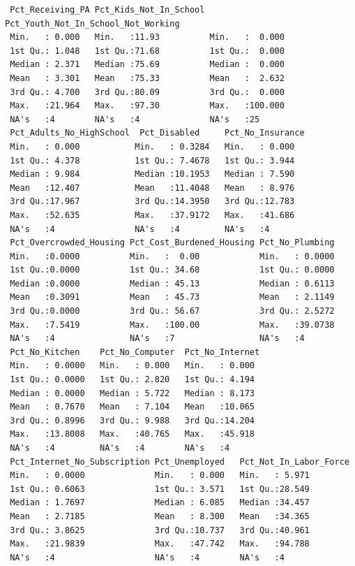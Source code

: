 \documentclass[
  letterpaper,
  DIV=11,
  numbers=noendperiod]{scrreprt}
\begin{document}
\begin{verbatim}
 Pct_Receiving_PA Pct_Kids_Not_In_School Pct_Youth_Not_In_School_Not_Working
 Min.   : 0.000   Min.   :11.93          Min.   :  0.000                    
 1st Qu.: 1.048   1st Qu.:71.68          1st Qu.:  0.000                    
 Median : 2.371   Median :75.69          Median :  0.000                    
 Mean   : 3.301   Mean   :75.33          Mean   :  2.632                    
 3rd Qu.: 4.700   3rd Qu.:80.09          3rd Qu.:  0.000                    
 Max.   :21.964   Max.   :97.30          Max.   :100.000                    
 NA's   :4        NA's   :4              NA's   :25                         
 Pct_Adults_No_HighSchool  Pct_Disabled     Pct_No_Insurance
 Min.   : 0.000           Min.   : 0.3284   Min.   : 0.000  
 1st Qu.: 4.378           1st Qu.: 7.4678   1st Qu.: 3.944  
 Median : 9.984           Median :10.1953   Median : 7.590  
 Mean   :12.407           Mean   :11.4048   Mean   : 8.976  
 3rd Qu.:17.967           3rd Qu.:14.3950   3rd Qu.:12.783  
 Max.   :52.635           Max.   :37.9172   Max.   :41.686  
 NA's   :4                NA's   :4         NA's   :4       
 Pct_Overcrowded_Housing Pct_Cost_Burdened_Housing Pct_No_Plumbing  
 Min.   :0.0000          Min.   :  0.00            Min.   : 0.0000  
 1st Qu.:0.0000          1st Qu.: 34.68            1st Qu.: 0.0000  
 Median :0.0000          Median : 45.13            Median : 0.6113  
 Mean   :0.3091          Mean   : 45.73            Mean   : 2.1149  
 3rd Qu.:0.0000          3rd Qu.: 56.67            3rd Qu.: 2.5272  
 Max.   :7.5419          Max.   :100.00            Max.   :39.0738  
 NA's   :4               NA's   :7                 NA's   :4        
 Pct_No_Kitchen    Pct_No_Computer  Pct_No_Internet 
 Min.   : 0.0000   Min.   : 0.000   Min.   : 0.000  
 1st Qu.: 0.0000   1st Qu.: 2.820   1st Qu.: 4.194  
 Median : 0.0000   Median : 5.722   Median : 8.173  
 Mean   : 0.7670   Mean   : 7.104   Mean   :10.065  
 3rd Qu.: 0.8996   3rd Qu.: 9.988   3rd Qu.:14.204  
 Max.   :13.8008   Max.   :40.765   Max.   :45.918  
 NA's   :4         NA's   :4        NA's   :4       
 Pct_Internet_No_Subscription Pct_Unemployed   Pct_Not_In_Labor_Force
 Min.   : 0.0000              Min.   : 0.000   Min.   : 5.971        
 1st Qu.: 0.6063              1st Qu.: 3.571   1st Qu.:28.549        
 Median : 1.7697              Median : 6.085   Median :34.457        
 Mean   : 2.7185              Mean   : 8.300   Mean   :34.365        
 3rd Qu.: 3.8625              3rd Qu.:10.737   3rd Qu.:40.961        
 Max.   :21.9839              Max.   :47.742   Max.   :94.788        
 NA's   :4                    NA's   :4        NA's   :4             
\end{verbatim}
\end{document}
